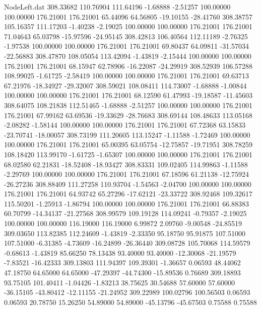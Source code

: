 \begin{filecontents}{NodeLeft.dat}
 308.33682  110.76904  111.64196    -1.68888   -2.51257  100.00000  100.00000  176.21001  176.21001   65.44096   64.56805  -19.10155  -28.41760
 308.38757  105.16357  111.17203    -1.40238   -2.19025  100.00000  100.00000  176.21001  176.21001   71.04643   65.03798  -15.97596  -24.95145
 308.42813  106.40564  112.11189    -2.76325   -1.97538  100.00000  100.00000  176.21001  176.21001   69.80437   64.09811  -31.57034  -22.56883
 308.47870  108.05054  113.42094    -1.43819   -2.15444  100.00000  100.00000  176.21001  176.21001   68.15947   62.78906  -16.22087  -24.29919
 308.52939  106.57288  108.99025    -1.61725   -2.58419  100.00000  100.00000  176.21001  176.21001   69.63713   67.21976  -18.34927  -29.32007
 308.59021  108.08411  114.73007    -1.68888   -1.00844  100.00000  100.00000  176.21001  176.21001   68.12590   61.47993  -19.18587  -11.45603
 308.64075  108.21838  112.51465    -1.68888   -2.51257  100.00000  100.00000  176.21001  176.21001   67.99162   63.69536  -19.33629  -28.76683
 308.69144  108.48633  113.05168    -2.08282   -1.58144  100.00000  100.00000  176.21001  176.21001   67.72368   63.15833  -23.70741  -18.00057
 308.73199  111.20605  113.15247    -1.11588   -1.72469  100.00000  100.00000  176.21001  176.21001   65.00395   63.05754  -12.75857  -19.71951
 308.78259  108.18420  113.99170    -1.61725   -1.65307  100.00000  100.00000  176.21001  176.21001   68.02580   62.21831  -18.52408  -18.93427
 308.83331  109.02405  114.99863    -1.11588   -2.29769  100.00000  100.00000  176.21001  176.21001   67.18596   61.21138  -12.75924  -26.27236
 308.88409  111.27258  110.93704    -1.54563   -2.04700  100.00000  100.00000  176.21001  176.21001   64.93742   65.27296  -17.62121  -23.33722
 308.92468  109.32617  115.50201    -1.25913   -1.86794  100.00000  100.00000  176.21001  176.21001   66.88383   60.70799  -14.34137  -21.27568
 308.99579  109.19128  114.09241    -0.79357   -2.19025  100.00000  100.00000  116.19000  116.19000    6.99872    2.09760   -9.00548  -24.85519
 309.03650  113.82385  112.24609    -1.43819   -2.33350   95.18750   95.91875  107.51000  107.51000   -6.31385   -4.73609  -16.24899  -26.36440
 309.08728  105.70068  114.59579    -0.68613   -1.43819   85.66250   78.13438   93.40000   93.40000  -12.30068  -21.19579   -7.83521  -16.42333
 309.13803  111.94397  109.39301    -1.36657    0.06593   48.44062   47.18750   64.65000   64.65000  -47.29397  -44.74300  -15.89536    0.76689
 309.18893   93.75105  101.40411    -1.04426   -1.83213   38.75625   30.54688   57.60000   57.60000  -36.15105  -43.80412  -12.11155  -21.24952
 309.22989  100.02796  100.56503     0.06593    0.06593   20.78750   15.26250   54.89000   54.89000  -45.13796  -45.67503    0.75588    0.75588

\end{filecontents}
